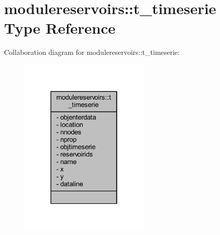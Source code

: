 \hypertarget{structmodulereservoirs_1_1t__timeserie}{}\section{modulereservoirs\+:\+:t\+\_\+timeserie Type Reference}
\label{structmodulereservoirs_1_1t__timeserie}


Collaboration diagram for modulereservoirs\+:\+:t\+\_\+timeserie\+:\nopagebreak
\begin{figure}[H]
\begin{center}
\leavevmode
\includegraphics[width=178pt]{structmodulereservoirs_1_1t__timeserie__coll__graph}
\end{center}
\end{figure}

